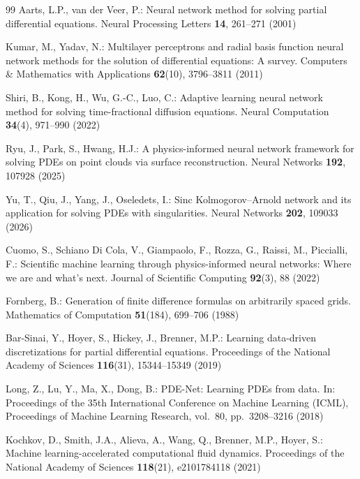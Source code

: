 \documentclass[pdflatex,sn-mathphys-num]{sn-jnl}%
\theoremstyle{thmstyleone}%
\theoremstyle{thmstyletwo}%
\theoremstyle{thmstylethree}%
\begin{document}
{\begin{thebibliography}{99}
Aarts, L.P., van der Veer, P.: Neural network method for solving partial differential equations. Neural Processing Letters \textbf{14}, 261--271 (2001)

Kumar, M., Yadav, N.: Multilayer perceptrons and radial basis function neural network methods for the solution of differential equations: A survey. Computers \& Mathematics with Applications \textbf{62}(10), 3796--3811 (2011)

Shiri, B., Kong, H., Wu, G.-C., Luo, C.: Adaptive learning neural network method for solving time-fractional diffusion equations. Neural Computation \textbf{34}(4), 971--990 (2022)

Ryu, J., Park, S., Hwang, H.J.: A physics-informed neural network framework for solving PDEs on point clouds via surface reconstruction. Neural Networks \textbf{192}, 107928 (2025)

Yu, T., Qiu, J., Yang, J., Oseledets, I.: Sinc Kolmogorov--Arnold network and its application for solving PDEs with singularities. Neural Networks \textbf{202}, 109033 (2026)

Cuomo, S., Schiano Di Cola, V., Giampaolo, F., Rozza, G., Raissi, M., Piccialli, F.: Scientific machine learning through physics-informed neural networks: Where we are and what's next. Journal of Scientific Computing \textbf{92}(3), 88 (2022)

Fornberg, B.: Generation of finite difference formulas on arbitrarily spaced grids. Mathematics of Computation \textbf{51}(184), 699--706 (1988)

Bar-Sinai, Y., Hoyer, S., Hickey, J., Brenner, M.P.: Learning data-driven discretizations for partial differential equations. Proceedings of the National Academy of Sciences \textbf{116}(31), 15344--15349 (2019)

Long, Z., Lu, Y., Ma, X., Dong, B.: PDE-Net: Learning PDEs from data. In: Proceedings of the 35th International Conference on Machine Learning (ICML), Proceedings of Machine Learning Research, vol.~80, pp.~3208--3216 (2018)

Kochkov, D., Smith, J.A., Alieva, A., Wang, Q., Brenner, M.P., Hoyer, S.: Machine learning-accelerated computational fluid dynamics. Proceedings of the National Academy of Sciences \textbf{118}(21), e2101784118 (2021)


\end{thebibliography}}
\end{document}
